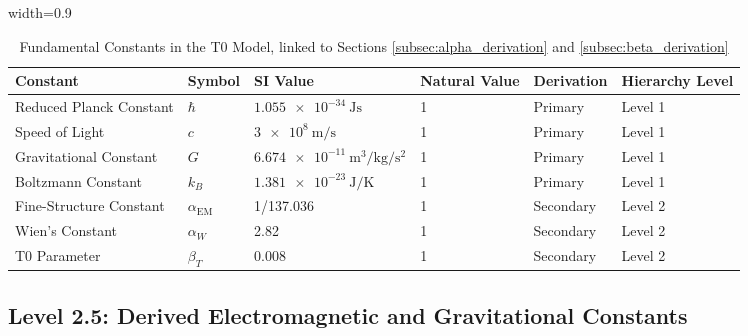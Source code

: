 \documentclass[12pt,a4paper]{article}
\newcommand{\tablescale}{0.9}
\begin{document}
	\begin{table}[htbp]
		\centering
		\begin{adjustbox}{width=\tablescale\textwidth}
			\begin{tabular}{llllll}
				\toprule
				\textbf{Constant} & \textbf{Symbol} & \textbf{SI Value} & \textbf{Natural Value} & \textbf{Derivation} & \textbf{Hierarchy Level} \\
				\midrule
				Reduced Planck Constant & \(\hbar\) & \(\SI{1.055e-34}{\joule\second}\) & 1 & Primary & Level 1 \\
				Speed of Light & \(c\) & \(\SI{3e8}{\meter\per\second}\) & 1 & Primary & Level 1 \\
				Gravitational Constant & \(G\) & \(\SI{6.674e-11}{\meter\cubed\per\kilogram\per\second\squared}\) & 1 & Primary & Level 1 \\
				Boltzmann Constant & \(k_B\) & \(\SI{1.381e-23}{\joule\per\kelvin}\) & 1 & Primary & Level 1 \\
				Fine-Structure Constant & \(\alpha_{\text{EM}}\) & 1/137.036 & 1 & Secondary & Level 2 \\
				Wien’s Constant & \(\alpha_W\) & 2.82 & 1 & Secondary & Level 2 \\
				T0 Parameter & \(\beta_T\) & 0.008 & 1 & Secondary & Level 2 \\
				\bottomrule
			\end{tabular}
		\end{adjustbox}
		\caption{Fundamental Constants in the T0 Model, linked to Sections \ref{subsec:alpha_derivation} and \ref{subsec:beta_derivation}}
		\label{tab:fund_const}
	\end{table}
	
	\subsection{Level 2.5: Derived Electromagnetic and Gravitational Constants}
	\label{subsec:level2.5}
	
\end{document}
